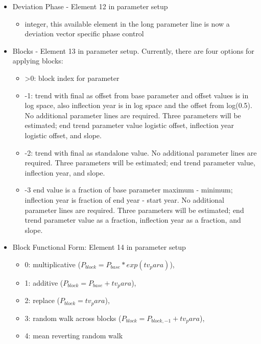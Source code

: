 \begin{itemize}
	\item Deviation Phase - Element 12 in parameter setup
		\begin{itemize}
			\item integer, this available element in the long parameter line is now a deviation vector specific phase control
		\end{itemize}
		
	\item Blocks - Element 13 in parameter setup. Currently, there are four options for applying blocks:
		\begin{itemize}
			\item >0: block index for parameter
			\item -1: trend with final as offset from base parameter and offset values is in log space, also inflection year is in log space and the offset from log(0.5). No additional parameter lines are required.  Three parameters will be estimated; end trend parameter value logistic offset, inflection year logistic offset, and slope.
			\item -2: trend with final as standalone value. No additional parameter lines are required. Three parameters will be estimated; end trend parameter value, inflection year, and slope.
			\item -3 end value is a fraction of base parameter maximum - minimum; inflection year is fraction of end year - start year. No additional parameter lines are required. Three parameters will be estimated; end trend parameter value as a fraction, inflection year as a fraction, and slope.
		\end{itemize}
		
	\item Block Functional Form: Element 14 in parameter setup
		\begin{itemize}
			\item 0: multiplicative ($P_{block} = P_{base}*exp(tv_para)$),
			\item 1: additive ($P_{block} = P_{base} + tv_para$),
			\item 2: replace ($P_{block} = tv_para$),
			\item 3: random walk across blocks ($P_{block} = P_{block,-1} + tv_para$),
			\item 4: mean reverting random walk
		\end{itemize}
\end{itemize}

